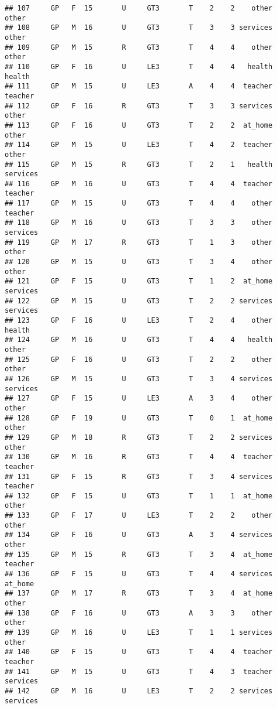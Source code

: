 \documentclass[
]{article}
\begin{document}
\begin{verbatim}
## 107     GP   F  15       U     GT3       T    2    2    other    other
## 108     GP   M  16       U     GT3       T    3    3 services    other
## 109     GP   M  15       R     GT3       T    4    4    other    other
## 110     GP   F  16       U     LE3       T    4    4   health   health
## 111     GP   M  15       U     LE3       A    4    4  teacher  teacher
## 112     GP   F  16       R     GT3       T    3    3 services    other
## 113     GP   F  16       U     GT3       T    2    2  at_home    other
## 114     GP   M  15       U     LE3       T    4    2  teacher    other
## 115     GP   M  15       R     GT3       T    2    1   health services
## 116     GP   M  16       U     GT3       T    4    4  teacher  teacher
## 117     GP   M  15       U     GT3       T    4    4    other  teacher
## 118     GP   M  16       U     GT3       T    3    3    other services
## 119     GP   M  17       R     GT3       T    1    3    other    other
## 120     GP   M  15       U     GT3       T    3    4    other    other
## 121     GP   F  15       U     GT3       T    1    2  at_home services
## 122     GP   M  15       U     GT3       T    2    2 services services
## 123     GP   F  16       U     LE3       T    2    4    other   health
## 124     GP   M  16       U     GT3       T    4    4   health    other
## 125     GP   F  16       U     GT3       T    2    2    other    other
## 126     GP   M  15       U     GT3       T    3    4 services services
## 127     GP   F  15       U     LE3       A    3    4    other    other
## 128     GP   F  19       U     GT3       T    0    1  at_home    other
## 129     GP   M  18       R     GT3       T    2    2 services    other
## 130     GP   M  16       R     GT3       T    4    4  teacher  teacher
## 131     GP   F  15       R     GT3       T    3    4 services  teacher
## 132     GP   F  15       U     GT3       T    1    1  at_home    other
## 133     GP   F  17       U     LE3       T    2    2    other    other
## 134     GP   F  16       U     GT3       A    3    4 services    other
## 135     GP   M  15       R     GT3       T    3    4  at_home  teacher
## 136     GP   F  15       U     GT3       T    4    4 services  at_home
## 137     GP   M  17       R     GT3       T    3    4  at_home    other
## 138     GP   F  16       U     GT3       A    3    3    other    other
## 139     GP   M  16       U     LE3       T    1    1 services    other
## 140     GP   F  15       U     GT3       T    4    4  teacher  teacher
## 141     GP   M  15       U     GT3       T    4    3  teacher services
## 142     GP   M  16       U     LE3       T    2    2 services services

\end{verbatim}
\end{document}
